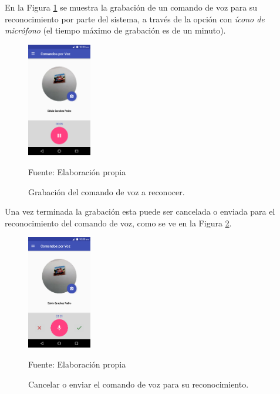 En la Figura \ref{fig:figura3.49} se muestra la grabación de un comando de voz para su reconocimiento por parte del sistema, a través de la opción con \textit{ícono de micrófono} (el tiempo máximo de grabación es de un minuto).
\begin{figure}[H]
\captionsetup{justification=centering}
\begin{center}
\includegraphics[width=0.25\textwidth]{Imagenes/Cap3/image049}
\end{center}
\begin{center}
\vskip -0.5cm
\caption{\small{Grabación del comando de voz a reconocer.}}
\label{fig:figura3.49}
{\small{Fuente: Elaboración propia}}
\end{center}
\end{figure}

Una vez terminada la grabación esta puede ser cancelada o enviada para el reconocimiento del comando de voz, como se ve en la Figura \ref{fig:figura3.50}.
\begin{figure}[H]
\captionsetup{justification=centering}
\begin{center}
\includegraphics[width=0.25\textwidth]{Imagenes/Cap3/image050}
\end{center}
\begin{center}
\vskip -0.5cm
\caption{\small{Cancelar o enviar el comando de voz para su reconocimiento.}}
\label{fig:figura3.50}
{\small{Fuente: Elaboración propia}}
\end{center}
\end{figure}

